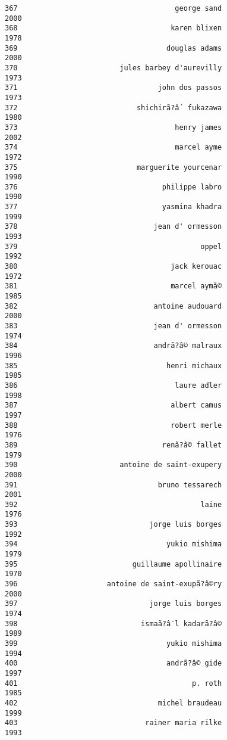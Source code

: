 \documentclass[
]{report}
\begin{document}
\begin{verbatim}
367                                     george sand                2000
368                                    karen blixen                1978
369                                   douglas adams                2000
370                        jules barbey d'aurevilly                1973
371                                 john dos passos                1973
372                            shichirã?â´ fukazawa                1980
373                                     henry james                2002
374                                     marcel ayme                1972
375                            marguerite yourcenar                1990
376                                  philippe labro                1990
377                                  yasmina khadra                1999
378                                jean d' ormesson                1993
379                                           oppel                1992
380                                    jack kerouac                1972
381                                    marcel aymã©                1985
382                                antoine audouard                2000
383                                jean d' ormesson                1974
384                                andrã?â© malraux                1996
385                                   henri michaux                1985
386                                     laure adler                1998
387                                    albert camus                1997
388                                    robert merle                1976
389                                  renã?â© fallet                1979
390                        antoine de saint-exupery                2000
391                                 bruno tessarech                2001
392                                           laine                1976
393                               jorge luis borges                1992
394                                   yukio mishima                1979
395                           guillaume apollinaire                1970
396                     antoine de saint-exupã?â©ry                2000
397                               jorge luis borges                1974
398                             ismaã?â¯l kadarã?â©                1989
399                                   yukio mishima                1994
400                                   andrã?â© gide                1997
401                                         p. roth                1985
402                                 michel braudeau                1999
403                              rainer maria rilke                1993

\end{verbatim}
\end{document}
